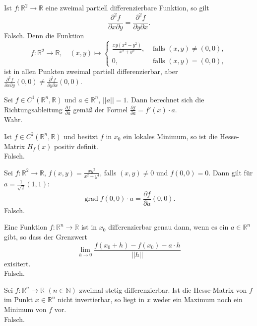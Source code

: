 \documentclass[parskip=full]{scrartcl}
\DeclareMathOperator{\grad}{grad}
\begin{document}
Ist $f : \mathbb{R}^2 \to \mathbb{R}$ eine zweimal partiell differenzierbare Funktion, so gilt
\begin{displaymath}
  \frac{\partial^2 f}{\partial x \partial y} = \frac{\partial^2 f}{\partial y \partial x}.
\end{displaymath}
Falsch.
Denn die Funktion
\begin{displaymath}
  f : \mathbb{R}^2 \to \mathbb{R}, \quad (x,y) \mapsto
  \begin{cases}
    \frac{xy(x^2 - y^2)}{x^2 + y^2},& \text{ falls } (x,y) \neq (0,0),\\
    0,& \text{ falls } (x,y) = (0,0),
  \end{cases}
\end{displaymath}
ist in allen Punkten zweimal partiell differenzierbar, aber $\frac{\partial^2 f}{\partial x \partial y}(0,0) \neq \frac{\partial^2 f}{\partial y \partial x}(0,0)$.

Sei $f \in C^1(\mathbb{R}^n, \mathbb{R})$ und $a \in \mathbb{R}^n$, $||a|| = 1$.
Dann berechnet sich die Richtungsableitung $\frac{\partial f}{\partial a}$ gemäß der Formel $\frac{\partial f}{\partial a} = f'(x) \cdot a$.\\
Wahr.

Ist $f \in C^2(\mathbb{R}^n, \mathbb{R})$ und besitzt $f$ in $x_0$ ein lokales Minimum, so ist die Hesse-Matrix $H_f(x)$ positiv definit.\\
Falsch.

Sei $f : \mathbb{R}^2 \to \mathbb{R}$, $f(x,y) = \frac{xy^2}{x^2 + y^4}$, falls $(x,y) \neq 0$ und $f(0,0) = 0$.
Dann gilt für $a = \frac{1}{\sqrt{2}}(1,1)$:
\begin{displaymath}
  \grad f(0,0) \cdot a = \frac{\partial f}{\partial a}(0,0).
\end{displaymath}
Falsch.

Eine Funktion $f : \mathbb{R}^n \to \mathbb{R}$ ist in $x_0$ differenzierbar genau dann, wenn es ein $a \in \mathbb{R}^n$ gibt, so dass der Grenzwert
\begin{displaymath}
  \lim_{h \to 0} \frac{f(x_0 + h) - f(x_0) - a \cdot h}{||h||}
\end{displaymath}
exisitert.\\
Falsch.

Sei $f : \mathbb{R}^n \to \mathbb{R}$ $(n \in \mathbb{N})$ zweimal stetig differenzierbar.
Ist die Hesse-Matrix von $f$ im Punkt $x \in \mathbb{R}^n$ nicht invertierbar, so liegt in $x$ weder ein Maximum noch ein Minimum von $f$ vor.\\
Falsch.
\end{document}

